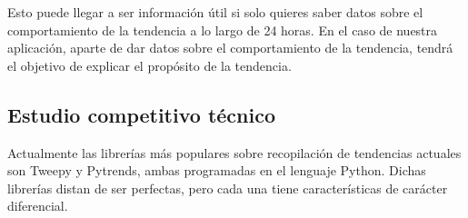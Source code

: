 \vspace{0.3cm}

Esto puede llegar a ser información útil si solo quieres saber datos sobre el comportamiento de la tendencia a lo largo de 24 horas. En el caso de nuestra aplicación, aparte de dar datos sobre el comportamiento de la tendencia, tendrá el objetivo de explicar el propósito de la tendencia.

\subsection{Estudio competitivo técnico}\label{sub:estudio-competitivo-tecnico}

Actualmente las librerías más populares sobre recopilación de tendencias actuales son Tweepy y Pytrends, ambas programadas en el lenguaje Python. Dichas librerías distan de ser perfectas, pero cada una tiene características de carácter diferencial.

\vspace{0.3cm}

